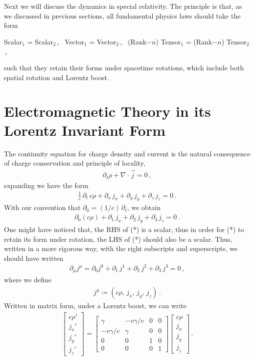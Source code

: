 \documentclass[11pt, onesided]{book}
\theoremstyle{break}
\theoremstyle{break}
\newcommand{\pd}{\partial}
\newcommand{\bmat}[1]{\begin{bmatrix} #1 \end{bmatrix}}
\begin{document}
\section[]{}
Next we will discuss the dynamics in special relativity. The principle is that, as we discussed in previous sections, all fundamental physics laws should take the form 
\begin{center}
Scalar$_1$ = Scalar$_2$\,,\ \quad
Vector$_1$ = Vector$_2$\,,\ \quad
(Rank$-n$) Tensor$_1$ = (Rank$-n$) Tensor$_2$\,,
\end{center}
such that they retain their forms under spacetime rotations, which include both spatial rotation and Lorentz boost.\\

\section[Electromagnetic Theory in its Lorentz Invariant Form]{\color{red} Electromagnetic Theory in its Lorentz Invariant Form\color{black}}
The continuity equation for charge density and current is the natural consequence of charge conservation and principle of locality,
\begin{align*}
\pd_t \rho + \nabla \cdot \vec{j} = 0\,,
\end{align*}
expanding we have the form
\begin{align*}
\frac{1}{c}\, \pd_t \, c\rho + \pd_x \,j_x + \pd_y \, j_y + \pd_z \, j_z = 0\,.
\end{align*}
With our convention that $\pd_0 = (1/c)\,\pd_t$, we obtain
\begin{align*}
\pd_0 (c\rho) + \pd_1 \,j_x + \pd_2 \, j_y + \pd_3 \, j_z = 0\,.
\tag{*}
\end{align*}
One might have noticed that, the RHS of (*) is a scalar, thus in order for (*) to retain its form under rotation, the LHS of (*) should also be a scalar. Thus, written in a more rigorous way, with the right subscripts and superscripts, we should have written 
\begin{align*}
\pd_\mu j^\mu =\pd_0 j^0 + \pd_1 \,j^1 + \pd_2 \, j^2 + \pd_3 \, j^3 = 0\,,
\end{align*}
where we define
\begin{align*}
j^\mu \coloneqq (c\rho,\, j_x,\, j_y , \,j_z)\,.
\end{align*}
Written in matrix form, under a Lorentz boost, we can write
\begin{align*}
\bmat{c\rho'  \\ j_x' \\ j_y' \\ j_z'} = 
\bmat{\gamma & -v\gamma/c & 0 & 0\\
-v\gamma/c & \gamma &0 &0\\
0 &0 &1 &0\\
0 & 0&0 & 1}
\bmat{c\rho  \\ j_x \\ j_y \\ j_z}\,.
\end{align*}
\end{document}
